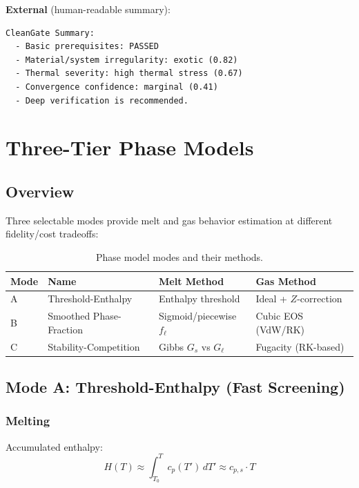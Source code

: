 \documentclass[11pt,a4paper]{article}
\begin{document}
\textbf{External} (human-readable summary):
\begin{lstlisting}
CleanGate Summary:
  - Basic prerequisites: PASSED
  - Material/system irregularity: exotic (0.82)
  - Thermal severity: high thermal stress (0.67)
  - Convergence confidence: marginal (0.41)
  - Deep verification is recommended.
\end{lstlisting}

\section{Three-Tier Phase Models}

\subsection{Overview}

Three selectable modes provide melt and gas behavior estimation at
different fidelity/cost tradeoffs:

\begin{table}[h]
\centering
\begin{tabular}{llll}
\toprule
\textbf{Mode} & \textbf{Name} & \textbf{Melt Method} & \textbf{Gas Method} \\
\midrule
A & Threshold-Enthalpy      & Enthalpy threshold        & Ideal + $Z$-correction \\
B & Smoothed Phase-Fraction & Sigmoid/piecewise $f_\ell$ & Cubic EOS (VdW/RK) \\
C & Stability-Competition   & Gibbs $G_s$ vs $G_\ell$   & Fugacity (RK-based) \\
\bottomrule
\end{tabular}
\caption{Phase model modes and their methods.}
\end{table}

\subsection{Mode A: Threshold-Enthalpy (Fast Screening)}

\subsubsection{Melting}

Accumulated enthalpy:
\begin{equation}
  H(T) \approx \int_{T_0}^{T} c_p(T')\,dT' \approx c_{p,s} \cdot T
\end{equation}
\end{document}
